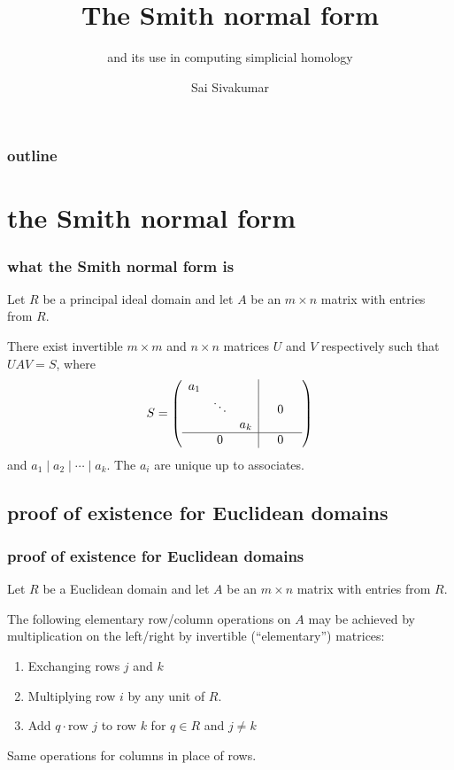\documentclass{beamer}
\title[The Smith normal form] %
{The Smith normal form}
\subtitle{and its use in computing simplicial homology}
\author[Sai Sivakumar] %
{Sai Sivakumar}
\begin{document}
\frame{\titlepage}

\begin{frame}
\frametitle{outline}
\tableofcontents
\end{frame}

\section{the Smith normal form}

\begin{frame}
  \frametitle{what the Smith normal form is}

  \begin{theorem}
    Let $R$ be a principal ideal domain and let $A$ be an $m\times n$ matrix with entries from $R$.
    
    There exist invertible $m\times m$ and $n\times n$ matrices $U$ and $V$ respectively such that $UAV = S$, where \[S = \left(\begin{array}{ccc|ccc}
      a_1 &  &  &  &  &\\
       & \ddots &  &  &0 &\\
       &  & a_k &  & \\
       \hline
       & 0 &  &  &0
    \end{array}\right)\] and $a_1\mid a_2\mid \cdots \mid a_k$. The $a_i$ are unique up to associates.
  \end{theorem}

\end{frame}

\subsection{proof of existence for Euclidean domains}

\begin{frame}
  \frametitle{proof of existence for Euclidean domains}

  Let $R$ be a Euclidean domain and let $A$ be an $m\times n$ matrix with entries from $R$.

  The following elementary row/column operations on $A$ may be achieved by multiplication on the left/right by invertible (``elementary'') matrices: \begin{enumerate}
    \item Exchanging rows $j$ and $k$
    \item Multiplying row $i$ by any unit of $R$.
    \item Add $q\cdot \text{row } j$ to row $k$ for $q\in R$ and $j\neq k$
  \end{enumerate}
  Same operations for columns in place of rows.
\end{frame}
\end{document}
